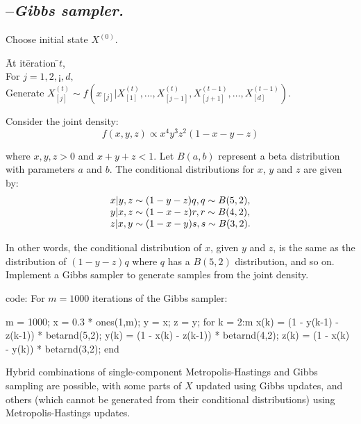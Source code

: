 \subsection{\alg --{\it Gibbs sampler.}}
Choose initial state $X^{(0)}$.
\begin{tabbing}

\=At it\=eration \=$t$,\\
				\>\>For $j$\>$ = 1, 2, ¡­, d,$\\
						\>\>\>Generate $X^{(t)}_{[j]}\sim f(x_{[j]}|X^{(t)}_{[1]},\ldots,X^{(t)}_{[j-1]},X^{(t-1)}_{[j+1]},\ldots,X^{(t-1)}_{[d]})$.\\
\end{tabbing}

\begin{example}
Consider the joint density:
$$f(x,y,z)\propto x^4y^3z^2(1-x-y-z)$$
 
where $x, y, z > 0$ and $x + y + z < 1$. Let $B(a, b)$ represent a beta distribution with parameters $a$ and $b$. The conditional distributions for $x$, $y$ and $z$ are given by:
\begin{displaymath}
\begin{array}{l}
 x|y,z\sim (1-y-z)q, \space q\sim B(5,2),\\
 y|x,z\sim (1-x-z)r, \space r\sim B(4,2),\\
 z|x,y\sim (1-x-y)s, \space s\sim B(3,2).\\
\end{array}
\end{displaymath}

	
In other words, the conditional distribution of $x$, given $y$ and $z$, is the same as the distribution of $(1-y-z)q$ where $q$ has a $B(5, 2)$ distribution, and so on. Implement a Gibbs sampler to generate samples from the joint density.

\Matlab code: For $m = 1000$ iterations of the Gibbs sampler:
\begin{VrbM}
m = 1000;
x = 0.3 * ones(1,m); %
y = x;
z = y;
for k = 2:m
	x(k) = (1 - y(k-1) - z(k-1)) * betarnd(5,2); %
	y(k) = (1 - x(k) - z(k-1)) * betarnd(4,2);
	z(k) = (1 - x(k) - y(k)) * betarnd(3,2);
end
\end{VrbM}
\end{example}

Hybrid combinations of single-component Metropolis-Hastings and Gibbs sampling are possible, with some parts of $X$ updated using Gibbs updates, and others (which cannot be generated from their conditional distributions) using Metropolis-Hastings updates.

